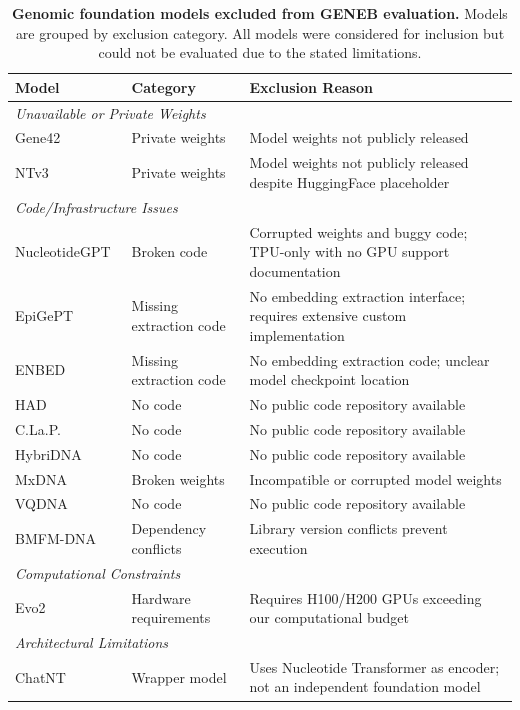 \documentclass{article}
\theoremstyle{plain}
\theoremstyle{definition}
\theoremstyle{remark}
\begin{document}
\begin{table}[h]
\centering
\caption{\textbf{Genomic foundation models excluded from GENEB evaluation.} Models are grouped by exclusion category. All models were considered for inclusion but could not be evaluated due to the stated limitations.}
\label{tab:excluded_models}
\small
\begin{tabular}{llp{7cm}}
\toprule
\textbf{Model} & \textbf{Category} & \textbf{Exclusion Reason} \\
\midrule
\multicolumn{3}{l}{\textit{Unavailable or Private Weights}} \\
Gene42~\cite{gene42} & Private weights & Model weights not publicly released \\
NTv3~\cite{ntv3} & Private weights & Model weights not publicly released despite HuggingFace placeholder \\
\midrule
\multicolumn{3}{l}{\textit{Code/Infrastructure Issues}} \\
NucleotideGPT~\cite{nucleotidegpt} & Broken code & Corrupted weights and buggy code; TPU-only with no GPU support documentation \\
EpiGePT~\cite{epigept} & Missing extraction code & No embedding extraction interface; requires extensive custom implementation \\
ENBED~\cite{enbed} & Missing extraction code & No embedding extraction code; unclear model checkpoint location \\
HAD~\cite{had} & No code & No public code repository available \\
C.La.P.~\cite{clap} & No code & No public code repository available \\
HybriDNA~\cite{hybridna} & No code & No public code repository available \\
MxDNA~\cite{mxdna} & Broken weights & Incompatible or corrupted model weights \\
VQDNA~\cite{vqdna}  & No code & No public code repository available \\
BMFM-DNA~\cite{bmfmdna} & Dependency conflicts & Library version conflicts prevent execution \\
\midrule
\multicolumn{3}{l}{\textit{Computational Constraints}} \\
Evo2~\cite{evo2} & Hardware requirements & Requires H100/H200 GPUs exceeding our computational budget \\
\midrule
\multicolumn{3}{l}{\textit{Architectural Limitations}} \\
ChatNT~\cite{chatnt} & Wrapper model & Uses Nucleotide Transformer as encoder; not an independent foundation model \\
\bottomrule
\end{tabular}
\end{table}
\end{document}
